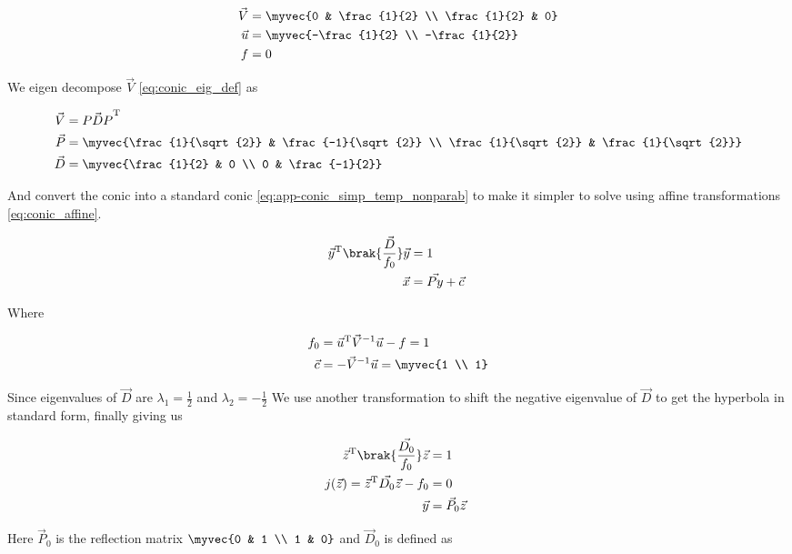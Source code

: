 \documentclass{article}
\numberwithin{equation}{section}
\numberwithin{figure}{section}
\begin{document}
\begin{align}
	\vec{V} &= \myvec{0 & \frac{1}{2} \\ \frac{1}{2} & 0}\\
	\vec{u} &= \myvec{-\frac{1}{2} \\ -\frac{1}{2}}\\
	f &= 0
\end{align}

We eigen decompose $\vec{V}$ \eqref{eq:conic_eig_def} as 

\begin{align}
	\vec{V} &= \vec{PDP}^\text{T}\\
	\vec{P} &= \myvec{\frac{1}{\sqrt{2}} & \frac{-1}{\sqrt{2}} \\ \frac{1}{\sqrt{2}} & \frac{1}{\sqrt{2}}}\\
	\vec{D} &= \myvec{\frac{1}{2} & 0 \\ 0 & \frac{-1}{2}}
\end{align}

And convert the conic into a standard conic \eqref{eq:app-conic_simp_temp_nonparab} to make it simpler to solve using affine transformations \eqref{eq:conic_affine}.

\begin{align}
	\vec{y}^\text{T}\brak{\frac{\vec{D}}{f_0}}\vec{y} &= 1\\
	\vec{x} &= \vec{Py} + \vec{c} \label{t1}\
\end{align}

Where 

\begin{align}
	f_0 &= \vec{u}^\text{T}\vec{V}^{-1}\vec{u} - f = 1\\
	\vec{c} &= -\vec{V}^{-1}\vec{u} = \myvec{1 \\ 1}
\end{align}

Since eigenvalues of $\vec{D}$ are $\lambda_1 = \frac{1}{2}$ and $\lambda_2=-\frac{1}{2}$ We use another transformation to shift the negative eigenvalue of $\vec{D}$ to get the hyperbola in standard form, finally giving us

\begin{align}
	\vec{z}^\text{T}\brak{\frac{\vec{D_0}}{f_0}}\vec{z} &= 1\\
	j(\vec{z}) = \vec{z}^\text{T}\vec{D_0}\vec{z} - f_0 &= 0  \label{standard_conic}\\
	\vec{y} &= \vec{P}_0\vec{z} \label{t2}\
\end{align}

Here $\vec{P}_0$ is the reflection matrix $\myvec{0 & 1 \\ 1 & 0}$ and $\vec{D}_0$ is defined as 
\end{document}
